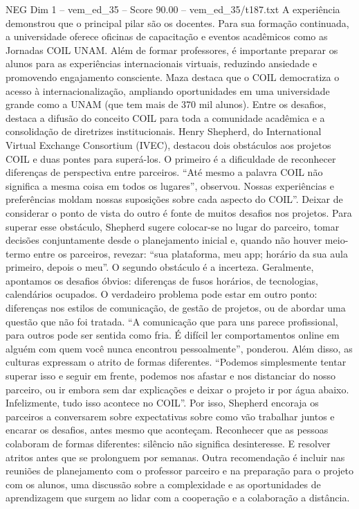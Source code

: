 \begin{textsample}{NEG Dim 1 – vem\_ed\_35 – Score 90.00 – vem\_ed\_35/t187.txt}
A experiência demonstrou que o principal pilar são os docentes.
Para sua formação continuada, a universidade oferece oficinas de capacitação e eventos acadêmicos como as Jornadas COIL UNAM.
Além de formar professores, é importante preparar os alunos para as experiências internacionais virtuais, reduzindo ansiedade e promovendo engajamento consciente.
Maza destaca que o COIL democratiza o acesso à internacionalização, ampliando oportunidades em uma universidade grande como a UNAM (que tem mais de 370 mil alunos).
Entre os desafios, destaca a difusão do conceito COIL para toda a comunidade acadêmica e a consolidação de diretrizes institucionais.
Henry Shepherd, do International Virtual Exchange Consortium (IVEC), destacou dois obstáculos aos projetos COIL e duas pontes para superá-los.
O primeiro é a dificuldade de reconhecer diferenças de perspectiva entre parceiros. “Até mesmo a palavra COIL não significa a mesma coisa em todos os lugares”, observou.
Nossas experiências e preferências moldam nossas suposições sobre cada aspecto do COIL”.
Deixar de considerar o ponto de vista do outro é fonte de muitos desafios nos projetos.
Para superar esse obstáculo, Shepherd sugere colocar-se no lugar do parceiro, tomar decisões conjuntamente desde o planejamento inicial e, quando não houver meio-termo entre os parceiros, revezar: “sua plataforma, meu app; horário da sua aula primeiro, depois o meu”.
O segundo obstáculo é a incerteza.
Geralmente, apontamos os desafios óbvios: diferenças de fusos horários, de tecnologias, calendários ocupados.
O verdadeiro problema pode estar em outro ponto: diferenças nos estilos de comunicação, de gestão de projetos, ou de abordar uma questão que não foi tratada. “A comunicação que para uns parece profissional, para outros pode ser sentida como fria.
É difícil ler comportamentos online em alguém com quem você nunca encontrou pessoalmente”, ponderou.
Além disso, as culturas expressam o atrito de formas diferentes. “Podemos simplesmente tentar superar isso e seguir em frente, podemos nos afastar e nos distanciar do nosso parceiro, ou ir embora sem dar explicações e deixar o projeto ir por água abaixo.
Infelizmente, tudo isso acontece no COIL”.
Por isso, Shepherd encoraja os parceiros a conversarem sobre expectativas sobre como vão trabalhar juntos e encarar os desafios, antes mesmo que aconteçam.
Reconhecer que as pessoas colaboram de formas diferentes: silêncio não significa desinteresse.
E resolver atritos antes que se prolonguem por semanas.
Outra recomendação é incluir nas reuniões de planejamento com o professor parceiro e na preparação para o projeto com os alunos, uma discussão sobre a complexidade e as oportunidades de aprendizagem que surgem ao lidar com a cooperação e a colaboração a distância.

\end{textsample}

